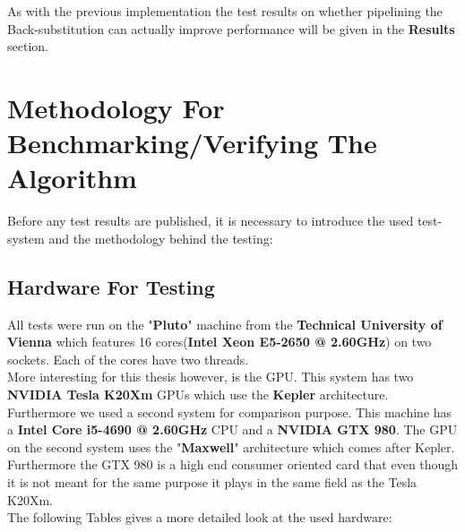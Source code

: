 \documentclass[draft, final]{vutinfth} %
\begin{document}
				As with the previous implementation the test results on whether pipelining the Back-substitution can actually improve performance will be given in the \textbf{Results} section.


%

\chapter{Methodology For Benchmarking/Verifying The Algorithm}
	Before any test results are published, it is necessary to introduce the used test-system and the methodology behind the testing:

	\section{Hardware For Testing}
		All tests were run on the "\textbf{Pluto}" machine from the \textbf{Technical University of Vienna} which features 16 cores(\textbf{Intel Xeon E5-2650 @ 2.60GHz}) on two sockets. Each of the cores have two threads.\\
		More interesting for this thesis however, is the GPU. This system has two \textbf{NVIDIA Tesla K20Xm} GPUs which use the \textbf{Kepler} architecture.\\
		Furthermore we used a second system for comparison purpose. This machine has a \textbf{Intel Core i5-4690 @ 2.60GHz} CPU and a \textbf{NVIDIA GTX 980}. The GPU on the second system uses the "\textbf{Maxwell}" architecture which comes after Kepler. Furthermore the GTX 980 is a high end consumer oriented card that even though it is not meant for the same purpose it plays in the same field as the Tesla K20Xm.\\
		The following Tables gives a more detailed look at the used hardware:
\end{document}
